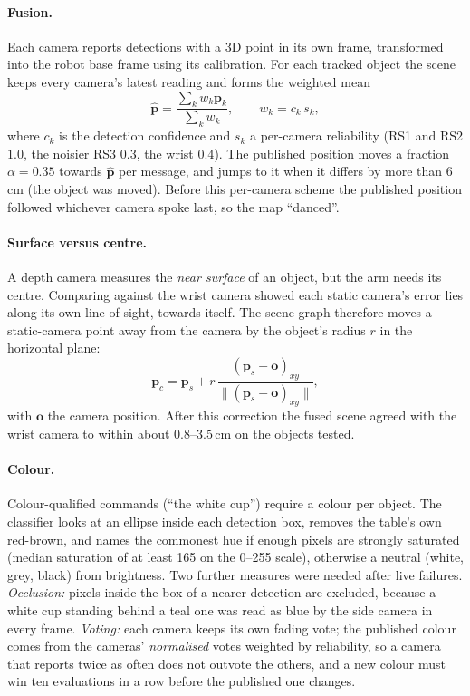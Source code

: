 \documentclass[12pt]{article}
\begin{document}
\paragraph{Fusion.}
Each camera reports detections with a 3D point in its own frame, transformed into the robot base frame using its calibration. For each tracked object the scene keeps every camera's latest reading and forms the weighted mean
\begin{equation}
  \hat{\mathbf p} = \frac{\sum_k w_k \mathbf p_k}{\sum_k w_k}, \qquad w_k = c_k\, s_k,
\end{equation}
where $c_k$ is the detection confidence and $s_k$ a per-camera reliability (RS1 and RS2 $1.0$, the noisier RS3 $0.3$, the wrist $0.4$). The published position moves a fraction $\alpha=0.35$ towards $\hat{\mathbf p}$ per message, and jumps to it when it differs by more than $6$\,cm (the object was moved). Before this per-camera scheme the published position followed whichever camera spoke last, so the map ``danced''.

\paragraph{Surface versus centre.}
A depth camera measures the \emph{near surface} of an object, but the arm needs its centre. Comparing against the wrist camera showed each static camera's error lies along its own line of sight, towards itself. The scene graph therefore moves a static-camera point away from the camera by the object's radius $r$ in the horizontal plane:
\begin{equation}
  \mathbf p_c = \mathbf p_s + r\,\frac{(\mathbf p_s-\mathbf o)_{xy}}{\lVert(\mathbf p_s-\mathbf o)_{xy}\rVert},
\end{equation}
with $\mathbf o$ the camera position. After this correction the fused scene agreed with the wrist camera to within about $0.8$--$3.5$\,cm on the objects tested.

\paragraph{Colour.}
Colour-qualified commands (``the white cup'') require a colour per object. The classifier looks at an ellipse inside each detection box, removes the table's own red-brown, and names the commonest hue if enough pixels are strongly saturated (median saturation of at least 165 on the 0--255 scale), otherwise a neutral (white, grey, black) from brightness. Two further measures were needed after live failures. \emph{Occlusion:} pixels inside the box of a nearer detection are excluded, because a white cup standing behind a teal one was read as blue by the side camera in every frame. \emph{Voting:} each camera keeps its own fading vote; the published colour comes from the cameras' \emph{normalised} votes weighted by reliability, so a camera that reports twice as often does not outvote the others, and a new colour must win ten evaluations in a row before the published one changes.
\end{document}
